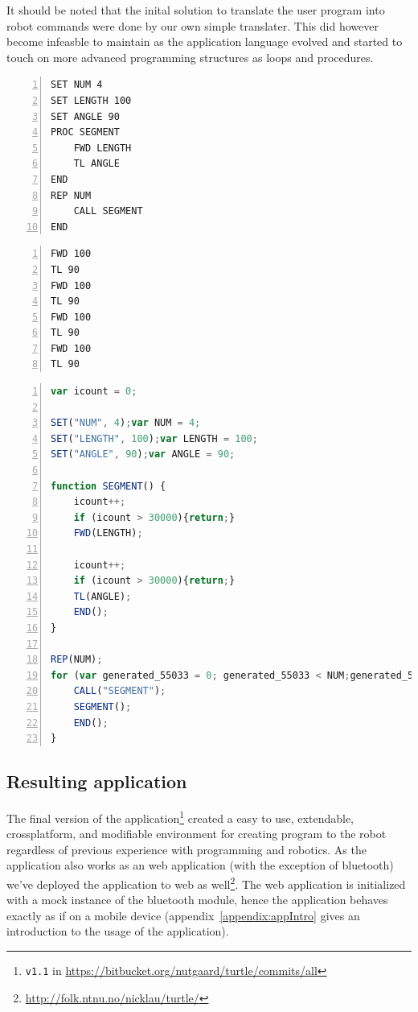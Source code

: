 \bigskip\noindent
It should be noted that the inital solution to translate the user program into robot commands were done by our own simple translater. This did however become infeasble to maintain as the application language evolved and started to touch on more advanced programming structures as loops and procedures.  

\begin{minipage}{\linewidth}
	\begin{lstlisting}[frame=single,numbers=left,caption={Example code for creating a square using variables (Extended language), procedures and loop.},language=MyBasic,label=lst:loop]
SET NUM 4
SET LENGTH 100
SET ANGLE 90
PROC SEGMENT
    FWD LENGTH
    TL ANGLE
END 
REP NUM
    CALL SEGMENT
END 
	\end{lstlisting}
	\begin{lstlisting}[frame=single,numbers=left,caption={Commands sent to simulator(Kernel language)},language=MyBasic,label=lst:commands]
FWD 100
TL 90
FWD 100
TL 90
FWD 100
TL 90
FWD 100
TL 90
	\end{lstlisting}
\end{minipage}
\begin{minipage}{\linewidth}
	\begin{lstlisting}[frame=single,numbers=left,caption={The internal representation of the previous program.},language=Javascript,label=lst:internal]
var icount = 0; 

SET("NUM", 4);var NUM = 4; 
SET("LENGTH", 100);var LENGTH = 100; 
SET("ANGLE", 90);var ANGLE = 90; 

function SEGMENT() { 
	icount++; 
	if (icount > 30000){return;} 
	FWD(LENGTH); 

	icount++; 
	if (icount > 30000){return;} 
	TL(ANGLE); 
	END();
} 

REP(NUM);
for (var generated_55033 = 0; generated_55033 < NUM;generated_55033++) { 
	CALL("SEGMENT");
	SEGMENT(); 
	END();
}
	\end{lstlisting}
\end{minipage}

\subsection*{Resulting application}
The final version of the application\footnote{\texttt{v1.1} in \url{https://bitbucket.org/nutgaard/turtle/commits/all}} created a easy to use, extendable, crossplatform, and modifiable environment for creating program to the robot regardless of previous experience with programming and robotics. As the application also works as an web application (with the exception of bluetooth) we've deployed the application to web as well\footnote{\url{http://folk.ntnu.no/nicklau/turtle/}}. The web application is initialized with a mock instance of the bluetooth module, hence the application behaves exactly as if on a mobile device (appendix~\ref{appendix:appIntro} gives an introduction to the usage of the application). 

